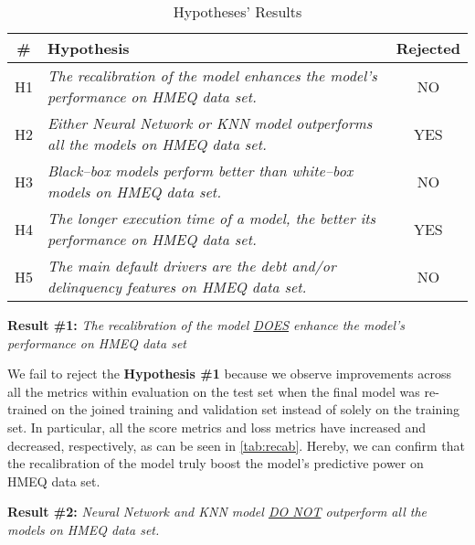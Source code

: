 \begin{table}[H]
    \small
    \setlength{\tabcolsep}{8pt}
    \centering
    \caption[Hypotheses' Results]{Hypotheses' Results}\label{tab:hypoconclusion}
    \renewcommand{\arraystretch}{1.5}
    \begin{tabular}{c p{10cm} c}
    \toprule
    \textbf{\#} & \textbf{Hypothesis} & \textbf{Rejected} \\
    \midrule
    \hline
    H1 & \textit{The recalibration of the model enhances the model's performance on HMEQ data set.} & NO \\
    H2 & \textit{Either Neural Network or KNN model outperforms all the models on HMEQ data set.} & YES \\
    H3 & \textit{Black--box models perform better than white--box models on HMEQ data set.} & NO \\
    H4 & \textit{The longer execution time of a model, the better its performance on HMEQ data set.} & YES \\
    H5 & \textit{The main default drivers are the debt and/or delinquency features on HMEQ data set.} & NO \\
    \hline
    \bottomrule
    \end{tabular}
    \vspace{0.35em}
    
    \vspace{-1em}
\end{table}


\noindent \textbf{Result \#1:} \textit{The recalibration of the model \underline{DOES} enhance the model's performance on HMEQ data set}

We fail to reject the \textbf{Hypothesis \#1} because we observe improvements across all the metrics within evaluation on the test set when the final model was re-trained on the joined training and validation set instead of solely on the training set.
In particular, all the score metrics and loss metrics have increased and decreased, respectively, as can be seen in \autoref{tab:recab}. Hereby, we can confirm that the recalibration of the model truly boost the model's predictive power on HMEQ data set.

\vspace{0.3cm}

\noindent \textbf{Result \#2:} \textit{Neural Network and KNN model \underline{DO NOT} outperform all the models on HMEQ data set.}

